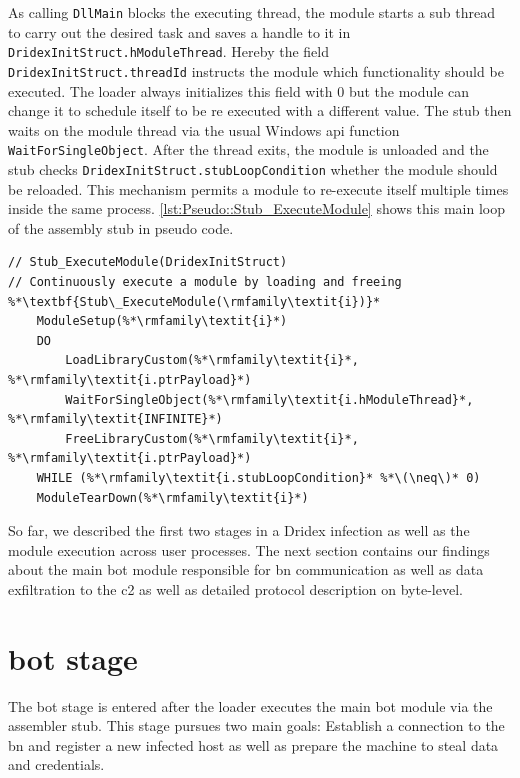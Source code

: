 As calling \lstinline|DllMain| blocks the executing thread, the module starts a sub thread to carry out the desired task and saves a handle to it in \lstinline|DridexInitStruct.hModuleThread|.
Hereby the field \lstinline|DridexInitStruct.threadId| instructs the module which functionality should be executed.
The loader always initializes this field with 0 but the module can change it to schedule itself to be re executed with a different value.
The stub then waits on the module thread via the usual Windows \gls{api} function \lstinline|WaitForSingleObject|.
After the thread exits, the module is unloaded and the stub checks \lstinline|DridexInitStruct.stubLoopCondition| whether the module should be reloaded.
This mechanism permits a module to re-execute itself multiple times inside the same process.
\autoref{lst:Pseudo::Stub_ExecuteModule} shows this main loop of the assembly stub in pseudo code.
\\

\begin{lstlisting}[style=pseudo, caption={Module execution loop in assembler stub}, label={lst:Pseudo::Stub_ExecuteModule}]
// Stub_ExecuteModule(DridexInitStruct)
// Continuously execute a module by loading and freeing
%*\textbf{Stub\_ExecuteModule(\rmfamily\textit{i})}*
    ModuleSetup(%*\rmfamily\textit{i}*)
    DO
        LoadLibraryCustom(%*\rmfamily\textit{i}*, %*\rmfamily\textit{i.ptrPayload}*)
        WaitForSingleObject(%*\rmfamily\textit{i.hModuleThread}*, %*\rmfamily\textit{INFINITE}*)
        FreeLibraryCustom(%*\rmfamily\textit{i}*, %*\rmfamily\textit{i.ptrPayload}*)
    WHILE (%*\rmfamily\textit{i.stubLoopCondition}* %*\(\neq\)* 0)
    ModuleTearDown(%*\rmfamily\textit{i}*)
\end{lstlisting}

\vspace{1em}
So far, we described the first two stages in a Dridex infection as well as the module execution across user processes.
The next section contains our findings about the main bot module responsible for \gls{bn} communication as well as data exfiltration to the \gls{c2} as well as detailed protocol description on byte-level.

\section{\Gls{bot} stage\label{sec:Reverse_engineering_Dridex::Bot_stage}}
The \gls{bot} stage is entered after the loader executes the main \gls{bot} module via the assembler stub.
This stage pursues two main goals: Establish a connection to the \gls{bn} and register a new infected host as well as prepare the machine to steal data and credentials.

